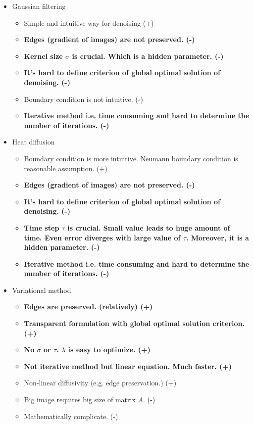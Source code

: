 \documentclass[paper=a4, fontsize=11pt]{scrartcl} %
\numberwithin{equation}{section} %
\numberwithin{figure}{section} %
\numberwithin{table}{section} %
\begin{document}
\begin{itemize}
	\begin{itemize}
		\item Gaussian filtering 
			\begin{itemize}
				\item Simple and intuitive way for denoising (+)
				\item \textbf{Edges (gradient of images) are not preserved. (-)}
				\item \textbf{Kernel size $\sigma$ is crucial. Which is a hidden parameter. (-)}
				\item \textbf{It's hard to define criterion of global optimal solution of denoising. (-)}
				\item Boundary condition is not intuitive. (-)
				\item \textbf{Iterative method i.e. time consuming and hard to determine the number of iterations. (-)} 
			\end{itemize}
		\item Heat diffusion 
			\begin{itemize}
				\item Boundary condition is more intuitive. Neumann boundary condition is reasonable assumption. (+)
				\item \textbf{Edges (gradient of images) are not preserved. (-)}
				\item \textbf{It's hard to define criterion of global optimal solution of denoising. (-)}
				\item \textbf{Time step $\tau$ is crucial. Small value leads to huge amount of time. Even error diverges with large value of $\tau$. Moreover, it is a hidden parameter. (-)}
				\item \textbf{Iterative method i.e. time consuming and hard to determine the number of iterations. (-)} 
			\end{itemize}
		\item Variational method
			\begin{itemize}
				\item \textbf{Edges are preserved. (relatively) (+)}
				\item \textbf{Transparent formulation with global optimal solution criterion. (+)}
				\item \textbf{No $\sigma$ or $\tau$. $\lambda$ is easy to optimize. (+)}
				\item \textbf{Not iterative method but linear equation. Much faster. (+)}
				\item Non-linear diffusivity (e.g. edge preservation.) (+)
				\item Big image requires big size of matrix $A$. (-) 
				\item Mathematically complicate. (-)
			\end{itemize}
	\end{itemize}


\end{itemize}
\end{document}

